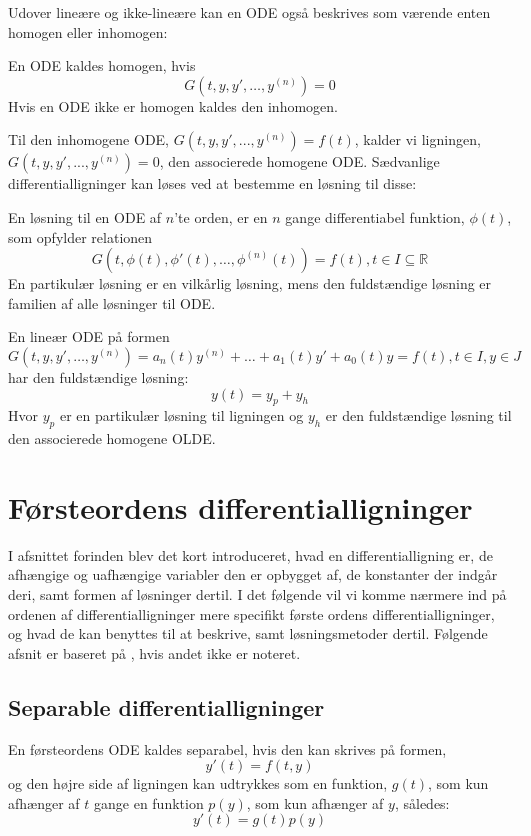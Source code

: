 Udover lineære og ikke-lineære kan en ODE også beskrives som værende enten homogen eller inhomogen:
\begin{definition}[Homogenitet]
En ODE kaldes homogen, hvis 
$$G(t,y,y', \hdots , y^{(n)})=0$$ 
Hvis en ODE ikke er homogen kaldes den inhomogen.
\end{definition}
Til den inhomogene ODE, $G(t,y,y',...,y^{(n)})=f(t)$, kalder vi ligningen, $G(t,y,y',...,y^{(n)})=0$, den associerede homogene ODE. Sædvanlige differentialligninger kan løses ved at bestemme en løsning til disse:
\begin{definition} 
En løsning til en ODE af $n$'te orden, er en $n$ gange differentiabel funktion, $\phi (t)$, som opfylder relationen
$$G(t,\phi (t),\phi '(t), \hdots, \phi^{(n)}(t))=f(t), t\in I \subseteq \mathbb{R}$$
En partikulær løsning er en vilkårlig løsning, mens den fuldstændige løsning er familien af alle løsninger til ODE.
\end{definition}

\begin{definition} 
En lineær ODE på formen 
$$G(t,y,y', \hdots , y^{(n)})=a_n(t)y^{(n)}+\hdots +a_1(t)y'+a_0(t)y=f(t), t\in I, y\in J$$
har den fuldstændige løsning:
$$y(t)=y_p+y_h$$
Hvor $y_p$ er en partikulær løsning til ligningen og $y_h$ er den fuldstændige løsning til den associerede homogene OLDE.
\end{definition}

\section{Førsteordens differentialligninger}
I afsnittet forinden blev det kort introduceret, hvad en differentialligning er, de afhængige og uafhængige variabler den er opbygget af, de konstanter der indgår deri, samt formen af løsninger dertil. I det følgende vil vi komme nærmere ind på ordenen af differentialligninger mere specifikt første ordens differentialligninger, og hvad de kan benyttes til at beskrive, samt løsningsmetoder dertil.
Følgende afsnit er baseret på \citep{JAB}, hvis andet ikke er noteret.
\subsection{Separable differentialligninger}

\begin{definition}
En førsteordens ODE kaldes separabel, hvis den kan skrives på formen, $$y'(t) = f(t,y)$$ og den højre side af ligningen kan udtrykkes som en funktion, $g(t)$, som kun afhænger af $t$ gange en funktion $p(y)$, som kun afhænger af $y$, således:$$y'(t)=g(t)p(y)$$
\end{definition}

